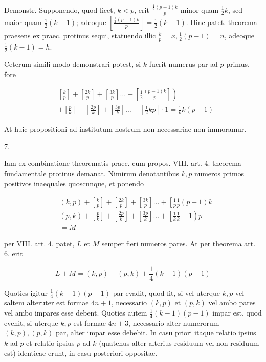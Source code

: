 \documentclass[10pt]{article}
\begin{document}
Demonstr. Supponendo, quod licet, \(k<p\), erit \(\frac{\frac{1}{2}(p-1) k}{p}\) minor quam \(\frac{1}{2} k\), sed maior quam \(\frac{1}{2}(k-1)\); adeoque \(\left[\frac{\frac{1}{2}(p-1) k}{p}\right]=\frac{1}{2}(k-1)\). Hinc patet. theorema praesens ex praec. protinus sequi, statuendo illic \(\frac{k}{p}=x, \frac{1}{2}(p-1)=n\), adeoque \(\frac{1}{2}(k-1)=h\).

Ceterum simili modo demonstrari potest, si \(k\) fuerit numerus par ad \(p\) primus, fore

\[
\begin{aligned}
& \left.\left[\frac{k}{p}\right]+\left[\frac{2 k}{p}\right]+\left[\frac{3 k}{p}\right] \ldots+\left[\frac{1}{2} \frac{(p-1) k}{p}\right]\right) \\
& +\left[\frac{p}{k}\right]+\left[\frac{2 p}{k}\right]+\left[\frac{3 p}{k}\right] \ldots+\left[\frac{1}{2} k p\right] \cdot 1=\frac{1}{k} k(p-1)
\end{aligned}
\]

At huic propositioni ad institutum nostrum non necessariae non immoramur.

7.

Iam ex combinatione theorematis praec. cum propos. VIII. art. 4. theorema fundamentale protinus demanat. Nimirum denotantibus \(k, p\) numeros primos positivos inaequales quoscunque, et ponendo

\[
\begin{aligned}
& (k, p)+\left[\frac{k}{p}\right]+\left[\frac{2 k}{p}\right]+\left[\frac{3 k}{p}\right] \ldots+\left[\frac{1}{p} \frac{1}{p}(p-1) k\right. \\
& (p, k)+\left[\frac{p}{k}\right]+\left[\frac{2 p}{k}\right]+\left[\frac{3 p}{k}\right] \ldots+\left[\frac{1}{k} \frac{1}{k}-1\right) p \\
& =M
\end{aligned}
\]

per VIII. art. 4. patet, \(L\) et \(M\) semper fieri numeros pares. At per theorema art. 6. erit

\[
L+M=(k, p)+(p, k)+\frac{1}{4}(k-1)(p-1)
\]

Quoties igitur \(\frac{1}{4}(k-1)(p-1)\) par evadit, quod fit, si vel uterque \(k, p\) vel saltem alteruter est formae \(4 n+1\), necessario \((k, p)\) et \((p, k)\) vel ambo pares vel ambo impares esse debent. Quoties autem \(\frac{1}{4}(k-1)(p-1)\) impar est, quod evenit, si uterque \(k, p\) est formae \(4 n+3\), necessario alter numerorum \((k, p),(p, k)\) par, alter impar esse debebit. In casu priori itaque relatio ipsius \(k\) ad \(p\) et relatio ipsius \(p\) ad \(k\) (quatenus alter alterius residuum vel non-residuum est) identicae erunt, in casu posteriori oppositae.
\end{document}
